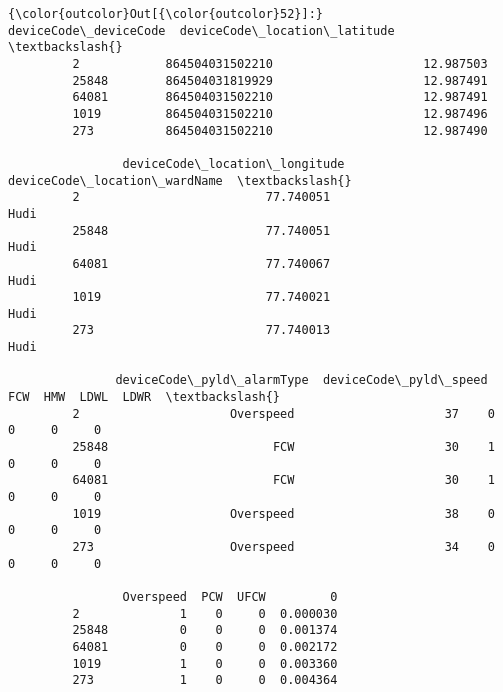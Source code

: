 \documentclass[11pt]{article}
\begin{document}
\begin{Verbatim}[commandchars=\\\{\}]
{\color{outcolor}Out[{\color{outcolor}52}]:}        deviceCode\_deviceCode  deviceCode\_location\_latitude  \textbackslash{}
         2            864504031502210                     12.987503   
         25848        864504031819929                     12.987491   
         64081        864504031502210                     12.987491   
         1019         864504031502210                     12.987496   
         273          864504031502210                     12.987490   
         
                deviceCode\_location\_longitude deviceCode\_location\_wardName  \textbackslash{}
         2                          77.740051                         Hudi   
         25848                      77.740051                         Hudi   
         64081                      77.740067                         Hudi   
         1019                       77.740021                         Hudi   
         273                        77.740013                         Hudi   
         
               deviceCode\_pyld\_alarmType  deviceCode\_pyld\_speed  FCW  HMW  LDWL  LDWR  \textbackslash{}
         2                     Overspeed                     37    0    0     0     0   
         25848                       FCW                     30    1    0     0     0   
         64081                       FCW                     30    1    0     0     0   
         1019                  Overspeed                     38    0    0     0     0   
         273                   Overspeed                     34    0    0     0     0   
         
                Overspeed  PCW  UFCW         0  
         2              1    0     0  0.000030  
         25848          0    0     0  0.001374  
         64081          0    0     0  0.002172  
         1019           1    0     0  0.003360  
         273            1    0     0  0.004364  
\end{Verbatim}
            
\end{document}
